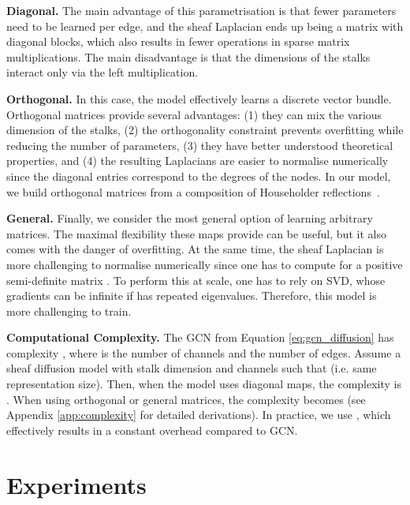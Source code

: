 \documentclass{article}
\begin{document}
\textbf{Diagonal. } 
The main advantage of this parametrisation is that fewer parameters need to be learned per edge, and the sheaf Laplacian ends up being a matrix with diagonal blocks, which also results in fewer operations in sparse matrix multiplications. The main disadvantage is that the  dimensions of the stalks interact only via the left  multiplication. 

\textbf{Orthogonal. } In this case, the model effectively learns a discrete vector bundle. Orthogonal matrices provide several advantages: (1) they can mix the various dimension of the stalks, (2) the orthogonality constraint prevents overfitting while reducing the number of parameters, (3) they have better understood theoretical properties, and (4) the resulting Laplacians are easier to normalise numerically since the diagonal entries correspond to the degrees of the nodes. In our model, we build orthogonal matrices from a composition of Householder reflections~\citep{mhammedi2017efficient}. 

\textbf{General. } Finally, we consider the most general option of learning arbitrary matrices. The maximal flexibility these maps provide can be useful, but it also comes with the danger of overfitting. At the same time, the sheaf Laplacian is more challenging to normalise numerically since one has to compute  for a positive semi-definite matrix . To perform this at scale, one has to rely on SVD, whose gradients can be infinite if  has repeated eigenvalues. Therefore, this model is more challenging to train. 

\textbf{Computational Complexity. } The GCN from Equation \ref{eq:gcn_diffusion} has complexity , where  is the number of channels and  the number of edges. Assume a sheaf diffusion model with stalk dimension  and  channels such that  (i.e. same representation size). Then, when the model uses diagonal maps, the complexity is . When using orthogonal or general matrices, the complexity becomes  (see Appendix \ref{app:complexity} for detailed derivations). 
In practice, we use  
, which effectively results in a constant overhead compared to GCN. 
\vspace{-10pt}

\section{Experiments}
\label{sec:exp}
\end{document}
